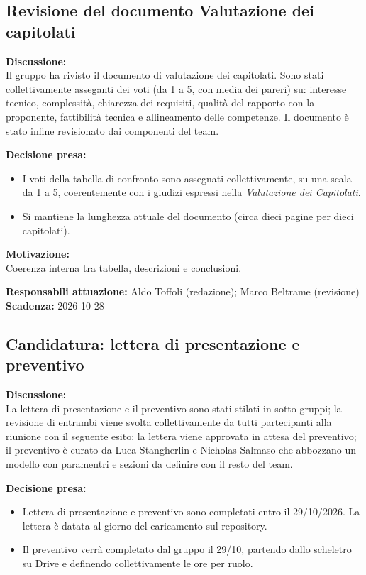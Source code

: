 \documentclass[12pt,a4paper]{article}
\newcommand{\tightlist}{\setlength{\itemsep}{1pt}\setlength{\parskip}{0pt}}
\begin{document}
\hypertarget{argomento-1}{%
\subsection{Revisione del documento Valutazione dei capitolati}}

\textbf{Discussione:} \\
Il gruppo ha rivisto il documento di valutazione dei capitolati. Sono stati collettivamente asseganti dei  voti (da 1 a 5, con media dei pareri) su: interesse tecnico, complessità, chiarezza dei requisiti, qualità del rapporto con la proponente, fattibilità tecnica e allineamento delle competenze. 
Il documento è stato infine revisionato dai componenti del team. 

\textbf{Decisione presa:}
\begin{itemize}
\tightlist
\item[$\checkmark$]  I voti della tabella di confronto sono assegnati collettivamente, su una scala da 1 a 5, coerentemente con i giudizi espressi nella \textit{Valutazione dei Capitolati}.

\item[$\checkmark$]  Si mantiene la lunghezza attuale del documento (circa dieci pagine per dieci capitolati).
\end{itemize}

\textbf{Motivazione:} \\
Coerenza interna tra tabella, descrizioni e conclusioni.

\textbf{Responsabili attuazione:} Aldo Toffoli (redazione); Marco Beltrame (revisione) \\
\textbf{Scadenza:} 2026-10-28


\hypertarget{argomento-4}{%
\subsection{Candidatura: lettera di presentazione e preventivo}}

\textbf{Discussione:} \\
 La lettera di presentazione e il preventivo sono stati stilati in sotto-gruppi; la revisione di entrambi viene svolta collettivamente da tutti partecipanti alla riunione con il seguente esito: la lettera viene approvata in attesa del preventivo; il preventivo è curato da Luca Stangherlin e Nicholas Salmaso che abbozzano un modello con paramentri e sezioni da definire con il resto del team. 

\textbf{Decisione presa:}
\begin{itemize}
\tightlist
\item[$\checkmark$]  Lettera di presentazione e preventivo sono completati entro il 29/10/2026. La lettera è datata al giorno del caricamento sul repository.
\item[$\checkmark$]  Il preventivo verrà completato dal gruppo il 29/10, partendo dallo scheletro su Drive e definendo collettivamente le ore per ruolo.
\end{itemize}
\end{document}
